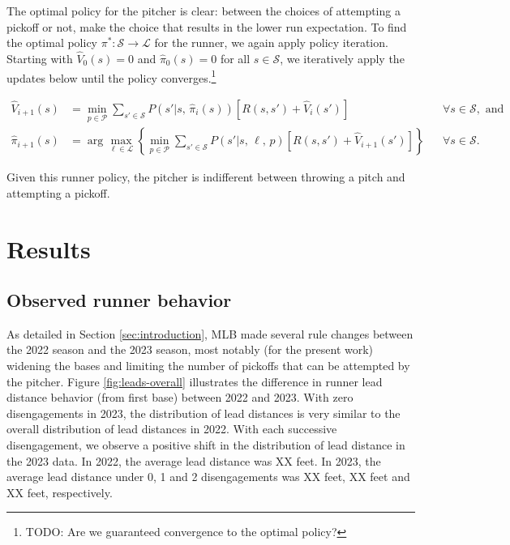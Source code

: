 \documentclass{article}
\begin{document}
        The optimal policy for the pitcher is clear: between the choices of attempting a pickoff or not, make the choice that results in the lower run expectation. To find the optimal policy $\pi^* : \mathcal{S} \rightarrow \mathcal{L}$ for the runner, we again apply policy iteration. Starting with $\hat V_0(s) = 0$ and $\hat \pi_0(s) = 0$ for all $s \in \mathcal{S}$, we iteratively apply the updates below until the policy converges.\footnote{TODO: Are we guaranteed convergence to the optimal policy?}
        
        \begin{align}
          \label{eqn:update-value-two-agent}
          \hat V_{i+1}(s) &= \min_{p \in \mathcal{P}} \sum_{s' \in \mathcal{S}} P(s' | s,\, \hat\pi_i(s)) [R(s, s') + \hat V_i(s')] && \forall s \in \mathcal{S}, \mbox{ and}\\
          \label{eqn:update-policy-two-agent}
          \hat\pi_{i+1}(s) &= \arg\max_{\ell \in \mathcal{L}} \left\{\min_{p \in \mathcal{P}}\sum_{s' \in \mathcal{S}} P(s' | s,\, \ell,\, p) [R(s, s') + \hat V_{i+1}(s')]\right\} && \forall s \in \mathcal{S}.
        \end{align}

        Given this runner policy, the pitcher is indifferent between throwing a pitch and attempting a pickoff.

  \section{Results}
  
    \subsection{Observed runner behavior}

      As detailed in Section \ref{sec:introduction}, MLB made several rule changes between the 2022 season and the 2023 season, most notably (for the present work) widening the bases and limiting the number of pickoffs that can be attempted by the pitcher. Figure \ref{fig:leads-overall} illustrates the difference in runner lead distance behavior (from first base) between 2022 and 2023. With zero disengagements in 2023, the distribution of lead distances is very similar to the overall distribution of lead distances in 2022. With each successive disengagement, we observe a positive shift in the distribution of lead distance in the 2023 data. In 2022, the average lead distance was XX feet. In 2023, the average lead distance under 0, 1 and 2 disengagements was XX feet, XX feet and XX feet, respectively.
 
\end{document}
